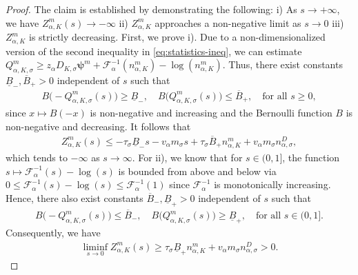 \documentclass[10pt,a4paper, final]{article}
\theoremstyle{definition}								%
\numberwithin{equation}{section}
\numberwithin{figure}{section}
\numberwithin{theorem}{section}
\begin{document}
\begin{proof}
    The claim is established by demonstrating the following:
    i) As $s\rightarrow + \infty $, we have $Z_{\alpha, K}^m(s) \rightarrow - \infty$
    ii) $Z_{\alpha, K}^m$ approaches a non-negative limit as $s\rightarrow 0$
    iii) $Z_{\alpha, K}^m$ is strictly decreasing.
    First, we prove i).
    Due to a non-dimensionalized version of the second inequality in \eqref{eq:statistics-ineq}, we can estimate
    $
        Q_{\alpha, K, \sigma}^m
        \geq
        z_\alpha D_{K, \sigma} \boldsymbol{\psi}^m + \mathcal{F}_\alpha^{-1}(n_{\alpha, K}^m) - \log(n_{\alpha, K}^m).
    $
    Thus, there exist constants $\underline{B}_{-}, \overline{B}_{+} > 0$ independent of $s$ such that
    \begin{align*}
        B\bigl( -Q_{\alpha, K, \sigma}^m (s) \bigr) \geq \underline{B}_{-},
        \quad
        B\bigl( Q_{\alpha, K, \sigma}^m (s) \bigr) \leq \overline{B}_{+},
            \quad  \text{for all } s \geq 0,
    \end{align*}
    since $x\mapsto B(-x) $ is non-negative and increasing and the Bernoulli function $B$ is non-negative and decreasing.
    It follows that
    \begin{align*}
        Z_{\alpha, K}^m (s)
        \leq
        - \tau_\sigma  \underline{B}_{-} s - v_\alpha m_\sigma s
        + \tau_\sigma  \overline{B}_{+} n_{\alpha, K}^m + v_\alpha m_\sigma n_{\alpha, \sigma}^D,
    \end{align*}
    which tends to $-\infty$ as $s \rightarrow \infty$.
    For ii), we know that for $s \in (0,1]$, the function $s \mapsto \mathcal{F}_\alpha^{-1}(s) - \log(s)$ is bounded from above and below via $0 \leq \mathcal{F}_\alpha^{-1}(s) - \log(s) \leq \mathcal{F}_\alpha^{-1}(1)$ since $\mathcal{F}_\alpha^{-1}$ is monotonically increasing.
    Hence, there also exist constants $\overline{B}_{-}, \underline{B}_{+} > 0$ independent of $s$ such that
    \begin{align*}
        B\bigl( -Q_{\alpha, K, \sigma}^m  (s) \bigr) \leq \overline{B}_{-},
        \quad
        B\bigl( Q_{\alpha, K, \sigma}^m  (s) \bigr) \geq \underline{B}_{+},
            \quad  \text{for all } s \in (0,1].
    \end{align*}
    Consequently,  we have
    \begin{align*}
        \liminf_{s\rightarrow 0} Z_{\alpha, K}^m (s)
        \geq
        \tau_\sigma  \underline{B}_{+} n_{\alpha, K}^m + v_\alpha m_\sigma n_{\alpha, \sigma}^D > 0.
    \end{align*}

\end{proof}
\end{document}
